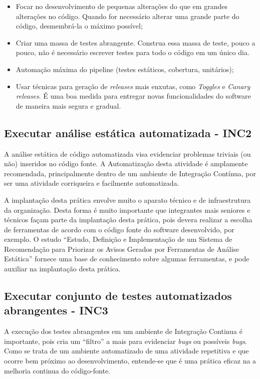 \begin{itemize}
	\item Focar no desenvolvimento de pequenas alterações do que em grandes alterações no código. Quando for necessário alterar uma grande parte do código, desmembrá-la o máximo possível;
	\item Criar uma massa de testes abrangente. Construa essa massa de teste, pouco a pouco, não é necessário escrever testes para todo o código em um único dia.
	\item Automação máxima do pipeline (testes estáticos, cobertura, unitários);
	\item Usar técnicas para geração de \textit{releases} mais enxutas, como \textit{Toggles} e \textit{Canary} \textit{releases}. É uma boa medida para entregar novas funcionalidades do software de maneira mais segura e gradual.
\end{itemize}

\subsection{Executar análise estática automatizada - INC2}
\label{sec:guiainc2}

A análise estática de código automatizada visa evidenciar problemas triviais (ou não) inseridos no código fonte. A Automatização desta atividade é amplamente recomendada, principalmente dentro de um ambiente de Integração Contínua, por ser uma atividade corriqueira e facilmente automatizada. 

A implantação desta prática envolve muito o aparato técnico e de infraestrutura da organização. Desta forma é muito importante que integrantes mais seniores e técnicos façam parte da implantação desta prática, pois devera realizar a escolha de ferramentas de acordo com o código fonte do software desenvolvido, por exemplo. O estudo “Estudo, Definição e Implementação de um Sistema de Recomendação para Priorizar os Avisos Gerados por Ferramentas de Análise Estática” \cite{estudoDefinicaoAnalisEstatica} fornece uma base de conhecimento sobre algumas ferramentas, e pode auxiliar na implantação desta prática.

\subsection{Executar conjunto de testes automatizados abrangentes - INC3}
\label{sec:guiainc3}

A execução dos testes abrangentes em um ambiente de Integração Continua é importante, pois cria um “filtro” a mais para evidenciar \textit{bugs} ou possíveis \textit{bugs}. Como se trata de um ambiente automatizado de uma atividade repetitiva e que ocorre bem próximo ao desenvolvimento, entende-se que é uma prática eficaz na a melhoria continua do código-fonte.

